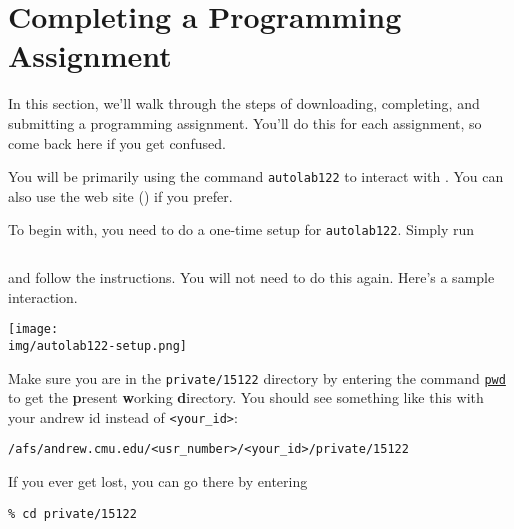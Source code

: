 \newcommand{\dirname}{\lstinline'sample-handout'}
\newcommand{\tgzname}{\dirname \lstinline'.tgz'}

\section*{Completing a Programming Assignment}

In this section, we'll walk through the steps of downloading,
completing, and submitting a programming assignment. You'll do this
for each assignment, so come back here if you get confused.

You will be primarily using the command \lstinline'autolab122' to
interact with \autolab{}.  You can also use the \autolab{} web site
(\href{\autolabURL}{\autolabURL}) if you prefer.


\begin{part}
To begin with, you need to do a one-time setup for \lstinline'autolab122'.
Simply run
\begin{lstlisting}[language={[coin]C}]
% autolab122 setup
\end{lstlisting}\vspace{-1.5ex}
and follow the instructions.  You will not need to do this again.
Here's a sample interaction.
\begin{center}
\texttt{[image: \\img/autolab122-setup.png]}
\end{center}
\end{part}


\begin{part}
  Make sure you are in the \lstinline[language={[coin]C}]'private/15122'
  directory by entering the command
  \underline{\lstinline[language={[coin]C}]'pwd'} to get the
    \textbf{\color{red}p}resent
  \textbf{\color{red}w}orking \textbf{\color{red}d}irectory. You should see something like this with your andrew id
  instead of \lstinline[language={[coin]C}]'<your_id>':

\begin{lstlisting}[language={[coin]C}]
% pwd
/afs/andrew.cmu.edu/<usr_number>/<your_id>/private/15122
\end{lstlisting}\vspace{-1.5ex}
If you ever get lost, you can go there by entering
\begin{lstlisting}[language={[coin]C}]
% cd
% cd private/15122
\end{lstlisting}\vspace{-1.5ex}
\end{part}


